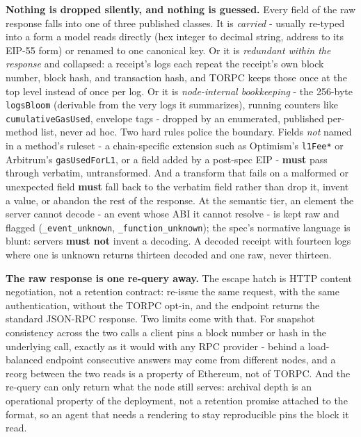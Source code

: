 \documentclass[11pt]{article}
\newcommand{\code}[1]{\texttt{#1}}
\begin{document}
\textbf{Nothing is dropped silently, and nothing is guessed.} Every field of the raw response falls into one of three published classes. It is \emph{carried} - usually re-typed into a form a model reads directly (hex integer to decimal string, address to its EIP-55 form) or renamed to one canonical key. Or it is \emph{redundant within the response} and collapsed: a receipt's logs each repeat the receipt's own block number, block hash, and transaction hash, and TORPC keeps those once at the top level instead of once per log. Or it is \emph{node-internal bookkeeping} - the 256-byte \code{logsBloom} (derivable from the very logs it summarizes), running counters like \code{cumulativeGasUsed}, envelope tags - dropped by an enumerated, published per-method list, never ad hoc. Two hard rules police the boundary. Fields \emph{not} named in a method's ruleset - a chain-specific extension such as Optimism's \code{l1Fee*} or Arbitrum's \code{gasUsedForL1}, or a field added by a post-spec EIP - \textbf{must} pass through verbatim, untransformed. And a transform that fails on a malformed or unexpected field \textbf{must} fall back to the verbatim field rather than drop it, invent a value, or abandon the rest of the response. At the semantic tier, an element the server cannot decode - an event whose ABI it cannot resolve - is kept raw and flagged (\code{\_event\_unknown}, \code{\_function\_unknown}); the spec's normative language is blunt: servers \textbf{must not} invent a decoding. A decoded receipt with fourteen logs where one is unknown returns thirteen decoded and one raw, never thirteen.

\textbf{The raw response is one re-query away.} The escape hatch is HTTP content negotiation, not a retention contract: re-issue the same request, with the same authentication, without the TORPC opt-in, and the endpoint returns the standard JSON-RPC response. Two limits come with that. For snapshot consistency across the two calls a client pins a block number or hash in the underlying call, exactly as it would with any RPC provider - behind a load-balanced endpoint consecutive answers may come from different nodes, and a reorg between the two reads is a property of Ethereum, not of TORPC. And the re-query can only return what the node still serves: archival depth is an operational property of the deployment, not a retention promise attached to the format, so an agent that needs a rendering to stay reproducible pins the block it read.
\end{document}
